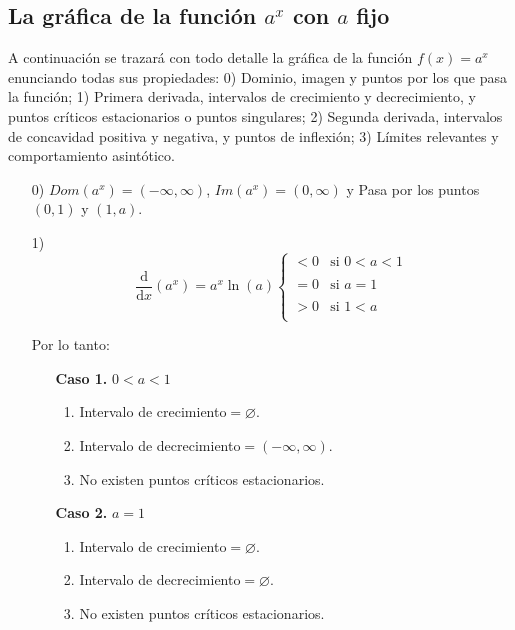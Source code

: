 \documentclass{article}
\numberwithin{equation}{section}
\newcommand{\col}[1]{\textcolor{ProcessBlue}{#1}}
\newcommand{\derivate}[2]{\frac{\mathrm{d}}{\mathrm{d}#1} \left(  {#2}  \right)  }
\begin{document}
\subsection{\col{La gráfica de la función \ensuremath{a^x} con \ensuremath{a} fijo}}

A continuación se trazará con todo detalle la gráfica de la función $f(x)=a^x$ enunciando todas sus propiedades: 0) Dominio, imagen y puntos por los que pasa la función; 1) Primera derivada, intervalos de crecimiento y decrecimiento, y puntos críticos estacionarios o puntos singulares; 2) Segunda derivada, intervalos de concavidad positiva y negativa, y puntos de inflexión; 3) Límites relevantes y comportamiento asintótico. 

\begin{enumerate}
    \item[0)] $Dom(a^x)=(-\infty,\infty)$, $Im(a^x)=(0,\infty)$ y Pasa por los puntos $(0,1)$ y $(1,a)$.
    \item[1)] $$ \derivate{x}{a^x}=a^x\ln(a)
    \left\{
        \begin{array}{lll}
            <0  & \mbox{si } 0<a<1 \\
            \\ =0 & \mbox{si } a=1 \\
            \\ >0 & \mbox{si } 1<a \\
        \end{array}
    \right.$$
    
    Por lo tanto:
    
    \begin{enumerate}
    
    \item[\textbf{Caso 1.}]  $0<a<1$
    \begin{enumerate}
    \item Intervalo de crecimiento$=\varnothing$.
    \item Intervalo de decrecimiento$=(-\infty,\infty)$.
    \item No existen puntos críticos estacionarios.
    \end{enumerate} 
    
    \item[\textbf{Caso 2.}]  $a=1$
    \begin{enumerate}
    \item Intervalo de crecimiento$=\varnothing$.
    \item Intervalo de decrecimiento$=\varnothing$.
    \item No existen puntos críticos estacionarios.
    \end{enumerate} 
    

\end{enumerate}
\end{enumerate}
\end{document}
